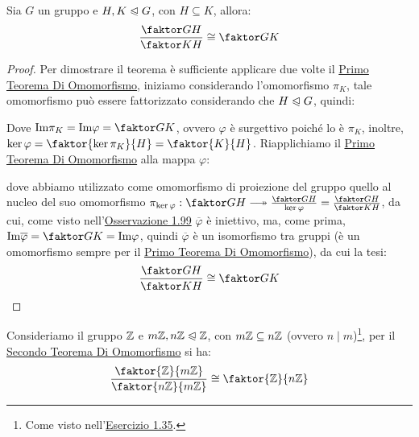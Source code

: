 \documentclass[11pt]{scrartcl}
\begin{document}
\newpage

\begin{theorem}
\label{g:2}
Sia $G$ un gruppo e $H, K \trianglelefteqslant G$, con $H \subseteq K$, allora:
	\[ \frac{\faktor GH}{\faktor KH} \cong \faktor GK
	\]
\end{theorem}

\begin{proof}
Per dimostrare il teorema è sufficiente applicare due volte il \hyperref[g:1]{Primo Teorema Di Omomorfismo}, iniziamo considerando l'omomorfismo $\pi_K$, tale omomorfismo può essere fattorizzato considerando che $H \trianglelefteqslant G$, quindi:
	\begin{center}
	\end{center}
Dove $\text{Im}\pi_K=\text{Im}\varphi=\faktor GK$, ovvero $\varphi$ è surgettivo poiché lo è $\pi_K$, inoltre, $\ker \varphi = \faktor{\ker \pi_K}{H} = \faktor{K}{H}$. Riapplichiamo il \hyperref[g:1]{Primo Teorema Di Omomorfismo} alla mappa $\varphi$:
	\begin{center}
	\end{center}
dove abbiamo utilizzato come omomorfismo di proiezione del gruppo quello al nucleo del suo omomorfismo $\pi_{\ker \varphi}: \faktor GH \twoheadlongrightarrow \frac{\faktor GH}{\ker \varphi}=\frac{\faktor GH}{\faktor KH}$, da cui, come visto nell'\hyperref[ker1]{Osservazione 1.99} $\overline{\varphi}$ è iniettivo, ma, come prima, $\text{Im}\overline{\varphi}=\faktor GK=\text{Im}\varphi$, quindi $\overline{\varphi}$ è un isomorfismo tra gruppi (è un omomorfismo sempre per il \hyperref[g:1]{Primo Teorema Di Omomorfismo}), da cui la tesi:
	\[ \frac{\faktor GH}{\faktor KH} \cong \faktor GK
	\]
\end{proof}

\begin{example}
[$\ZZ$]
Consideriamo il gruppo $\ZZ$ e $m\mathbb Z, n\mathbb Z \trianglelefteqslant \mathbb Z$, con $m\mathbb Z \subseteq n\mathbb Z$ (ovvero $n \mid m$)\footnote{Come visto nell'\hyperref[g:ex135]{Esercizio 1.35}.}, per il \hyperref[g:1]{Secondo Teorema Di Omomorfismo} si ha:
	\[ \frac{\faktor {\ZZ}{m\ZZ}}{\faktor {n\ZZ}{m\ZZ}} \cong \faktor{\ZZ}{n\ZZ}
	\]
\end{example}
\end{document}
